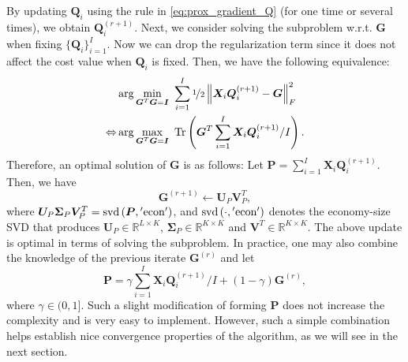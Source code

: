 \documentclass[10pt,journal]{IEEEtran}
\newtheorem{Remark}{Remark}
\newcommand{\G}{\boldsymbol{G}}
\newcommand{\Q}{\boldsymbol{Q}}
\begin{document}
By updating $\Q_i$ using the rule in \eqref{eq:prox_gradient_Q} (for one time or several times), we obtain
$\Q_i^{(r+1)}$.
Next, we consider solving the subproblem w.r.t. ${\bm G}$ when fixing $\{{\bm Q}_i\}_{i=1}^I$.
Now we can drop the regularization term since it does not affect the cost value when $\Q_i$ is fixed.
Then, we have the following equivalence:
\begin{align*}
	&\arg\min_{{\bm G}^T{\bm G}={\bm I}}~\sum_{i=1}^I\nicefrac{1}{2}\left\|{\bm X}_i{\bm Q}_i^{(r+1)}-{\bm G}\right\|_F^2\\
	\Leftrightarrow &\arg\max_{{\bm G}^T{\bm G}={\bm I}}~{\rm Tr}\left({\bm G}^T\sum_{i=1}^I{\bm X}_i{\bm Q}_i^{(r+1)}/I\right). \label{eq:G_sln}
\end{align*}
Therefore, an optimal solution of ${\bm G}$ is as follows:
Let ${\bm P}=\sum_{i=1}^I{\bm X}_i{\bm Q}_i^{(r+1)}.$
Then, we have 
\[{\bm G}^{(r+1)} \leftarrow {\bm U}_P{\bm V}^T_P,\]
where ${\bm U}_P{\bm \Sigma}_P{\bm V}^T_P = {\rm svd}\left({\bm P},{\rm 'econ'}\right)$,
and ${\rm svd}\left(\cdot,{\rm 'econ'}\right)$ denotes the economy-size SVD that produces ${\bm U}_P\in\mathbb{R}^{L\times K}$,
${\bm \Sigma}_P\in\mathbb{R}^{K\times K}$ and ${\bm V}^T\in\mathbb{R}^{K\times K}$.
The above update is optimal in terms of solving the subproblem. In practice, one may also combine the knowledge of the previous iterate $\G^{(r)}$ and let
\begin{equation}
 {\bm P}=\gamma\sum_{i=1}^I{\bm X}_i{\bm Q}_i^{(r+1)}/I + (1-\gamma)\G^{(r)}, 
\end{equation}
where $\gamma\in(0,1]$. 
Such a slight modification of forming ${\bm P}$ does not increase the complexity and is very easy to implement.
However, such a simple combination helps establish nice convergence properties of the algorithm, as we will see in the next section.




\end{document}
